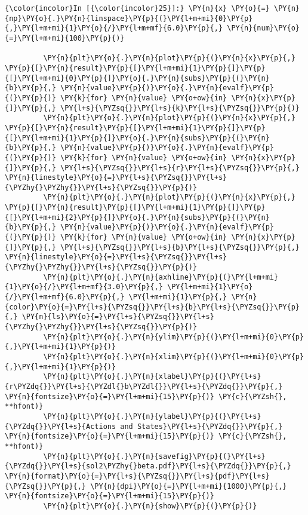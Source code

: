     

    \begin{Verbatim}[commandchars=\\\{\}]
{\color{incolor}In [{\color{incolor}25}]:} \PY{n}{x} \PY{o}{=} \PY{n}{np}\PY{o}{.}\PY{n}{linspace}\PY{p}{(}\PY{l+m+mi}{0}\PY{p}{,}\PY{l+m+mi}{1}\PY{o}{/}\PY{l+m+mf}{6.0}\PY{p}{,} \PY{n}{num}\PY{o}{=}\PY{l+m+mi}{100}\PY{p}{)}
         
         \PY{n}{plt}\PY{o}{.}\PY{n}{plot}\PY{p}{(}\PY{n}{x}\PY{p}{,} \PY{p}{[}\PY{n}{result}\PY{p}{[}\PY{l+m+mi}{1}\PY{p}{]}\PY{p}{[}\PY{l+m+mi}{0}\PY{p}{]}\PY{o}{.}\PY{n}{subs}\PY{p}{(}\PY{n}{b}\PY{p}{,} \PY{n}{value}\PY{p}{)}\PY{o}{.}\PY{n}{evalf}\PY{p}{(}\PY{p}{)} \PY{k}{for} \PY{n}{value} \PY{o+ow}{in} \PY{n}{x}\PY{p}{]}\PY{p}{,} \PY{l+s}{\PYZsq{}}\PY{l+s}{k}\PY{l+s}{\PYZsq{}}\PY{p}{)}
         \PY{n}{plt}\PY{o}{.}\PY{n}{plot}\PY{p}{(}\PY{n}{x}\PY{p}{,} \PY{p}{[}\PY{n}{result}\PY{p}{[}\PY{l+m+mi}{1}\PY{p}{]}\PY{p}{[}\PY{l+m+mi}{1}\PY{p}{]}\PY{o}{.}\PY{n}{subs}\PY{p}{(}\PY{n}{b}\PY{p}{,} \PY{n}{value}\PY{p}{)}\PY{o}{.}\PY{n}{evalf}\PY{p}{(}\PY{p}{)} \PY{k}{for} \PY{n}{value} \PY{o+ow}{in} \PY{n}{x}\PY{p}{]}\PY{p}{,} \PY{l+s}{\PYZsq{}}\PY{l+s}{r}\PY{l+s}{\PYZsq{}}\PY{p}{,} \PY{n}{linestyle}\PY{o}{=}\PY{l+s}{\PYZsq{}}\PY{l+s}{\PYZhy{}\PYZhy{}}\PY{l+s}{\PYZsq{}}\PY{p}{)}
         \PY{n}{plt}\PY{o}{.}\PY{n}{plot}\PY{p}{(}\PY{n}{x}\PY{p}{,} \PY{p}{[}\PY{n}{result}\PY{p}{[}\PY{l+m+mi}{1}\PY{p}{]}\PY{p}{[}\PY{l+m+mi}{2}\PY{p}{]}\PY{o}{.}\PY{n}{subs}\PY{p}{(}\PY{n}{b}\PY{p}{,} \PY{n}{value}\PY{p}{)}\PY{o}{.}\PY{n}{evalf}\PY{p}{(}\PY{p}{)} \PY{k}{for} \PY{n}{value} \PY{o+ow}{in} \PY{n}{x}\PY{p}{]}\PY{p}{,} \PY{l+s}{\PYZsq{}}\PY{l+s}{b}\PY{l+s}{\PYZsq{}}\PY{p}{,} \PY{n}{linestyle}\PY{o}{=}\PY{l+s}{\PYZsq{}}\PY{l+s}{\PYZhy{}\PYZhy{}}\PY{l+s}{\PYZsq{}}\PY{p}{)}
         \PY{n}{plt}\PY{o}{.}\PY{n}{axhline}\PY{p}{(}\PY{l+m+mi}{1}\PY{o}{/}\PY{l+m+mf}{3.0}\PY{p}{,} \PY{l+m+mi}{1}\PY{o}{/}\PY{l+m+mf}{6.0}\PY{p}{,} \PY{l+m+mi}{1}\PY{p}{,} \PY{n}{color}\PY{o}{=}\PY{l+s}{\PYZsq{}}\PY{l+s}{b}\PY{l+s}{\PYZsq{}}\PY{p}{,} \PY{n}{ls}\PY{o}{=}\PY{l+s}{\PYZsq{}}\PY{l+s}{\PYZhy{}\PYZhy{}}\PY{l+s}{\PYZsq{}}\PY{p}{)}
         \PY{n}{plt}\PY{o}{.}\PY{n}{ylim}\PY{p}{(}\PY{l+m+mi}{0}\PY{p}{,}\PY{l+m+mi}{1}\PY{p}{)}
         \PY{n}{plt}\PY{o}{.}\PY{n}{xlim}\PY{p}{(}\PY{l+m+mi}{0}\PY{p}{,}\PY{l+m+mi}{1}\PY{p}{)}
         \PY{n}{plt}\PY{o}{.}\PY{n}{xlabel}\PY{p}{(}\PY{l+s}{r\PYZdq{}}\PY{l+s}{\PYZdl{}b\PYZdl{}}\PY{l+s}{\PYZdq{}}\PY{p}{,} \PY{n}{fontsize}\PY{o}{=}\PY{l+m+mi}{15}\PY{p}{)} \PY{c}{\PYZsh{}, **hfont)}
         \PY{n}{plt}\PY{o}{.}\PY{n}{ylabel}\PY{p}{(}\PY{l+s}{\PYZdq{}}\PY{l+s}{Actions and States}\PY{l+s}{\PYZdq{}}\PY{p}{,} \PY{n}{fontsize}\PY{o}{=}\PY{l+m+mi}{15}\PY{p}{)} \PY{c}{\PYZsh{}, **hfont)}
         \PY{n}{plt}\PY{o}{.}\PY{n}{savefig}\PY{p}{(}\PY{l+s}{\PYZdq{}}\PY{l+s}{sol2\PYZhy{}beta.pdf}\PY{l+s}{\PYZdq{}}\PY{p}{,} \PY{n}{format}\PY{o}{=}\PY{l+s}{\PYZsq{}}\PY{l+s}{pdf}\PY{l+s}{\PYZsq{}}\PY{p}{,} \PY{n}{dpi}\PY{o}{=}\PY{l+m+mi}{1000}\PY{p}{,} \PY{n}{fontsize}\PY{o}{=}\PY{l+m+mi}{15}\PY{p}{)}
         \PY{n}{plt}\PY{o}{.}\PY{n}{show}\PY{p}{(}\PY{p}{)}
\end{Verbatim}

